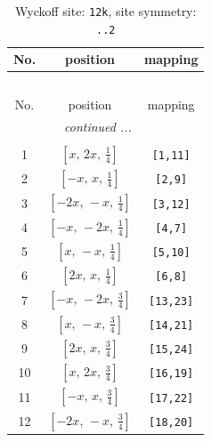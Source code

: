 \documentclass[fleqn,8pt]{jsarticle}
\begin{document}
\begin{longtable}{ccc}
\caption{Wyckoff site: {\tt 12k}, site symmetry: {\tt ..2}}
 \\
 \hline \hline
No. & position & mapping \\ \hline \endfirsthead

\multicolumn{2}{l}{\tablename\ \thetable{}} \\
 \hline \hline
No. & position & mapping \\ \hline \endhead

 \hline \hline
\multicolumn{2}{r}{\footnotesize\it continued ...} \\ \endfoot

 \hline \hline
\multicolumn{2}{r}{} \\ \endlastfoot

1 & $\left[ x,\, 2 x,\, \frac{1}{4} \right]$ & {\tt [1,11]} \\ \hline
2 & $\left[ - x,\, x,\, \frac{1}{4} \right]$ & {\tt [2,9]} \\ \hline
3 & $\left[ - 2 x,\, - x,\, \frac{1}{4} \right]$ & {\tt [3,12]} \\ \hline
4 & $\left[ - x,\, - 2 x,\, \frac{1}{4} \right]$ & {\tt [4,7]} \\ \hline
5 & $\left[ x,\, - x,\, \frac{1}{4} \right]$ & {\tt [5,10]} \\ \hline
6 & $\left[ 2 x,\, x,\, \frac{1}{4} \right]$ & {\tt [6,8]} \\ \hline
7 & $\left[ - x,\, - 2 x,\, \frac{3}{4} \right]$ & {\tt [13,23]} \\ \hline
8 & $\left[ x,\, - x,\, \frac{3}{4} \right]$ & {\tt [14,21]} \\ \hline
9 & $\left[ 2 x,\, x,\, \frac{3}{4} \right]$ & {\tt [15,24]} \\ \hline
10 & $\left[ x,\, 2 x,\, \frac{3}{4} \right]$ & {\tt [16,19]} \\ \hline
11 & $\left[ - x,\, x,\, \frac{3}{4} \right]$ & {\tt [17,22]} \\ \hline
12 & $\left[ - 2 x,\, - x,\, \frac{3}{4} \right]$ & {\tt [18,20]} \\
\end{longtable}
\renewcommand{\arraystretch}{1.2}
\end{document}
